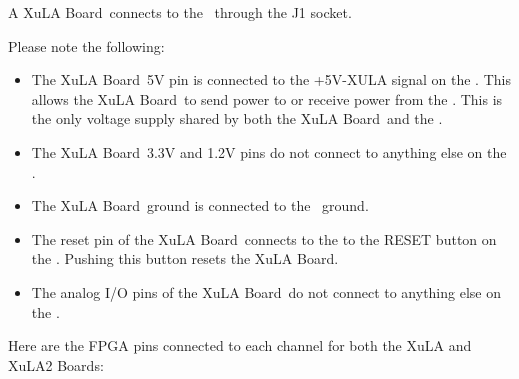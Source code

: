 \documentclass[letterpaper,11pt,oneside]{memoir}
\newcommand{\xula}{XuLA Board}
\renewcommand{\fixedpic}[1]{}
\begin{document}
A \xula\ connects to the \product\ through the J1 socket.

\fixedpic{\texttt{[image: XuLA\_socket.png]}}

Please note the following:

\begin{itemize}
\item The \xula\ 5V pin is connected to the +5V-XULA signal on the \product.
	This allows the \xula\ to send power to or receive power from the \product.
	This is the only voltage supply shared by both the \xula\ and the \product.
\item The \xula\ 3.3V and 1.2V pins do not connect to anything else on the \product.
\item The \xula\ ground is connected to the \product\ ground.
\item The reset pin of the \xula\ connects to the to the RESET button 
	on the \product. Pushing this button resets the \xula.
\item The analog I/O pins of the \xula\ do not connect to anything else 
	on the \product.
\end{itemize}

Here are the FPGA pins connected to each channel for both the XuLA and XuLA2 Boards:
\end{document}
